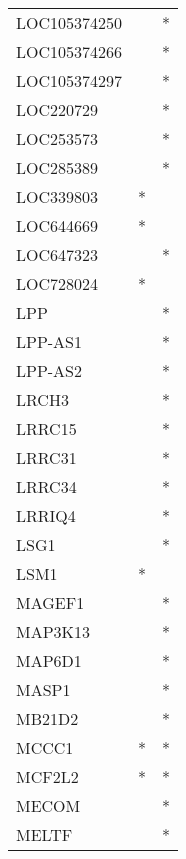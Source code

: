 \begin{longtable}{lcc}
LOC105374250     &                &          * \\
LOC105374266     &                &          * \\
LOC105374297     &                &          * \\
LOC220729        &                &          * \\
LOC253573        &                &          * \\
LOC285389        &                &          * \\
LOC339803        &              * &            \\
LOC644669        &              * &            \\
LOC647323        &                &          * \\
LOC728024        &              * &            \\
LPP              &                &          * \\
LPP-AS1          &                &          * \\
LPP-AS2          &                &          * \\
LRCH3            &                &          * \\
LRRC15           &                &          * \\
LRRC31           &                &          * \\
LRRC34           &                &          * \\
LRRIQ4           &                &          * \\
LSG1             &                &          * \\
LSM1             &              * &            \\
MAGEF1           &                &          * \\
MAP3K13          &                &          * \\
MAP6D1           &                &          * \\
MASP1            &                &          * \\
MB21D2           &                &          * \\
MCCC1            &              * &          * \\
MCF2L2           &              * &          * \\
MECOM            &                &          * \\
MELTF            &                &          * \\

\end{longtable}
